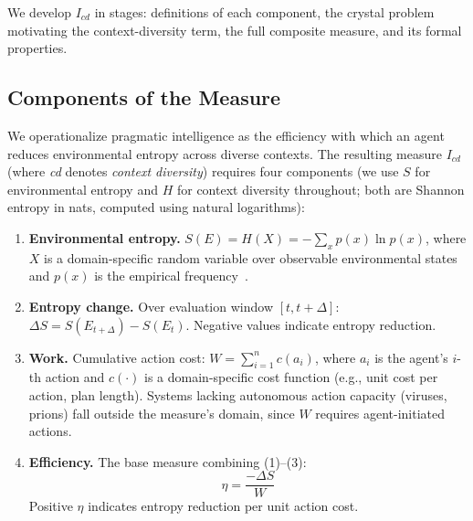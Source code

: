\documentclass[runningheads,a4paper]{llncs}
\begin{document}
We develop $I_{cd}$ in stages: definitions of each component, the crystal problem motivating the context-diversity term, the full composite measure, and its formal properties.

\subsection{Components of the Measure}
\label{sec:definitions}

We operationalize pragmatic intelligence as the efficiency with which an agent reduces environmental entropy across diverse contexts. The resulting measure $I_{cd}$ (where \emph{cd} denotes \emph{context diversity}) requires four components (we use $S$ for environmental entropy and $H$ for context diversity throughout; both are Shannon entropy in nats, computed using natural logarithms):

\begin{enumerate}
\item \textbf{Environmental entropy.} $S(E) = H(X) = -\sum_{x} p(x) \ln p(x)$, where $X$ is a domain-specific random variable over observable environmental states and $p(x)$ is the empirical frequency~\cite{jaynes1957information,zurek1989algorithmic,kolchinsky2018semantic}.

\item \textbf{Entropy change.} Over evaluation window $[t, t{+}\Delta]$: $\Delta S = S(E_{t+\Delta}) - S(E_t)$. Negative values indicate entropy reduction.

\item \textbf{Work.} Cumulative action cost: $W = \sum_{i=1}^{n} c(a_i)$, where $a_i$ is the agent's $i$-th action and $c(\cdot)$ is a domain-specific cost function (e.g., unit cost per action, plan length). Systems lacking autonomous action capacity (viruses, prions) fall outside the measure's domain, since $W$ requires agent-initiated actions.

\item \textbf{Efficiency.} The base measure combining (1)--(3):
\begin{equation}
\eta = \frac{-\Delta S}{W}
\end{equation}
Positive $\eta$ indicates entropy reduction per unit action cost.
\end{enumerate}
\end{document}
